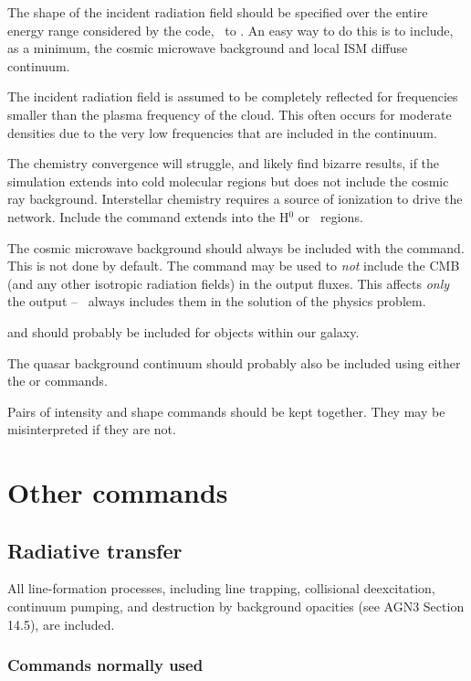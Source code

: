 \documentclass[12pt,twoside]{article}
\begin{document}
{The shape of the incident radiation field
should be specified over the entire
energy range considered by the code, \emm\ to \egamrymev.   An easy way to do
this is to include, as a minimum, the cosmic microwave background and local
ISM diffuse continuum.

The incident radiation field is assumed to be completely reflected for frequencies
smaller than the plasma frequency of the cloud.  This often occurs for
moderate densities due to the very low frequencies that are included in
the continuum.

The chemistry convergence will struggle, and likely find bizarre results,
if the simulation extends into cold molecular regions but does not include
the cosmic ray background.  Interstellar chemistry requires a source
of ionization to drive the network.  
Include the  command
extends into the H$^0$ or \htwo\ regions.

The cosmic microwave background
should always be included with the 
command.  This is not done by default.
The command 
may be used to {\em not} include the CMB (and any other
isotropic radiation fields) in the output fluxes.
This affects {\em only} the output -- \Cloudy\ always
includes them in the solution of the physics problem.

 and  should probably be included for
objects within our galaxy.

The quasar background continuum
should probably also be included using
either the  or  commands.

Pairs of intensity and shape commands should be kept together.  They
may be misinterpreted if they are not.

\section{Other commands}
\label{sec:OtherCommands}

\subsection{Radiative transfer}

All line-formation processes, including line trapping, collisional
deexcitation, continuum pumping, and destruction by background opacities
(see AGN3 Section 14.5), are included.

\subsubsection{Commands normally used}

}
\end{document}
